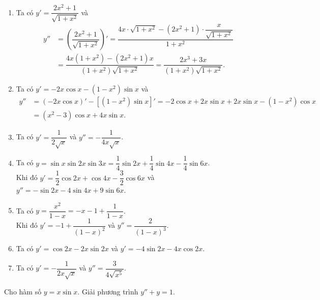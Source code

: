 \begin{ex}
{\begin{enumerate}
		\item Ta có $y'=\dfrac{2x^2+1}{\sqrt{1+x^2}}$ và \begin{align*}
		y''&=\left(\dfrac{2x^2+1}{\sqrt{1+x^2}}\right)'=\dfrac{4x\cdot\sqrt{1+x^2}-\left(2x^2+1\right)\cdot\dfrac{x}{\sqrt{1+x^2}}}{1+x^2}\\ 
		&=\dfrac{4x\left(1+x^2\right)-\left(2x^2+1\right)x}{\left(1+x^2\right)\sqrt{1+x^2}}=\dfrac{2x^3+3x}{\left(1+x^2\right)\sqrt{1+x^2}}. 
	\end{align*}
	 \item Ta có $y'=-2x\cos x-\left(1-x^2\right)\sin x$ và
	\begin{align*}
		y''&=\left(-2x\cos x\right)'-\left[\left(1-x^2\right)\sin  x\right]'=-2\cos x+2x\sin x+2x\sin x-\left(1-x^2\right)\cos x\\
		&=\left(x^2-3\right)\cos x+4x\sin x. 
	\end{align*}
	\item Ta có $y'=\dfrac{1}{2\sqrt{x}}$  và $y''=-\dfrac{1}{4x\sqrt{x}}$.
	\item Ta có $y=\sin x\sin 2x\sin 3x=\dfrac{1}{4}\sin 2x+\dfrac{1}{4}\sin 4x-\dfrac{1}{4}\sin  6x$.\\
	Khi đó $y'=\dfrac{1}{2}\cos 2x+\cos 4x-\dfrac{3}{2}\cos  6x$ và $y''=-\sin 2x-4\sin 4x+9\sin 6x$.
	\item Ta có  $y=\dfrac{x^2}{1-x}=-x-1+\dfrac{1}{1-x}$.\\
	 Khi đó $y'=-1+\dfrac{1}{(1-x)^2}$ và $y''=\dfrac{2}{(1-x)^3}$.
	\item Ta có  $y'=\cos 2x-2x\sin 2x$ và $y'=-4\sin 2x-4x\cos 2x$.
	\item  Ta có $y'=-\dfrac{1}{2x\sqrt{x}}$ và $y''=\dfrac{3}{4\sqrt{x^5}}$.
	\end{enumerate}
 }
\end{ex}

\begin{bt}%
	Cho hàm số $y=x\sin x$. Giải phương trình $y''+y=1$.
\end{bt}

